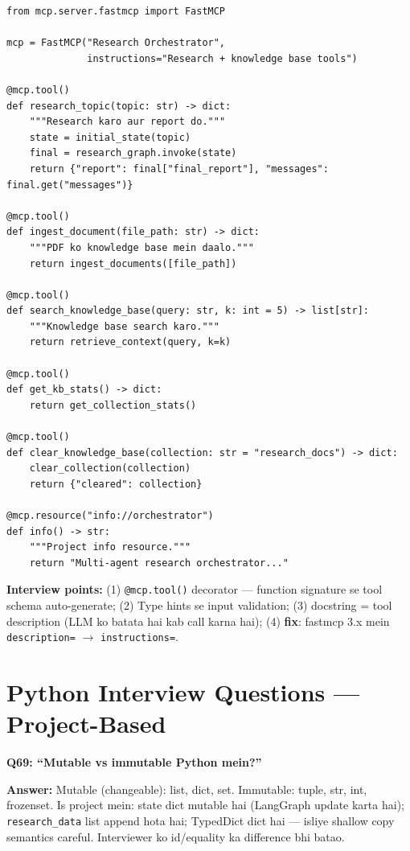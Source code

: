 \begin{codestorybox}
\begin{lstlisting}[style=pythonstyle, caption={MCP tool pattern}]
from mcp.server.fastmcp import FastMCP

mcp = FastMCP("Research Orchestrator",
              instructions="Research + knowledge base tools")

@mcp.tool()
def research_topic(topic: str) -> dict:
    """Research karo aur report do."""
    state = initial_state(topic)
    final = research_graph.invoke(state)
    return {"report": final["final_report"], "messages": final.get("messages")}

@mcp.tool()
def ingest_document(file_path: str) -> dict:
    """PDF ko knowledge base mein daalo."""
    return ingest_documents([file_path])

@mcp.tool()
def search_knowledge_base(query: str, k: int = 5) -> list[str]:
    """Knowledge base search karo."""
    return retrieve_context(query, k=k)

@mcp.tool()
def get_kb_stats() -> dict:
    return get_collection_stats()

@mcp.tool()
def clear_knowledge_base(collection: str = "research_docs") -> dict:
    clear_collection(collection)
    return {"cleared": collection}

@mcp.resource("info://orchestrator")
def info() -> str:
    """Project info resource."""
    return "Multi-agent research orchestrator..."
\end{lstlisting}

\textbf{Interview points:} (1) \texttt{@mcp.tool()} decorator --- function signature se tool schema auto-generate; (2) Type hints se input validation; (3) docstring = tool description (LLM ko batata hai kab call karna hai); (4) \textbf{fix}: fastmcp 3.x mein \texttt{description=} $\rightarrow$ \texttt{instructions=}.
\end{codestorybox}

\section{Python Interview Questions --- Project-Based}

\begin{interviewbox}
\textbf{Q69: ``Mutable vs immutable Python mein?''}

\textbf{Answer:} Mutable (changeable): list, dict, set. Immutable: tuple, str, int, frozenset. Is project mein: state dict mutable hai (LangGraph update karta hai); \texttt{research\_data} list append hota hai; TypedDict dict hai --- isliye shallow copy semantics careful. Interviewer ko id/equality ka difference bhi batao.
\end{interviewbox}

